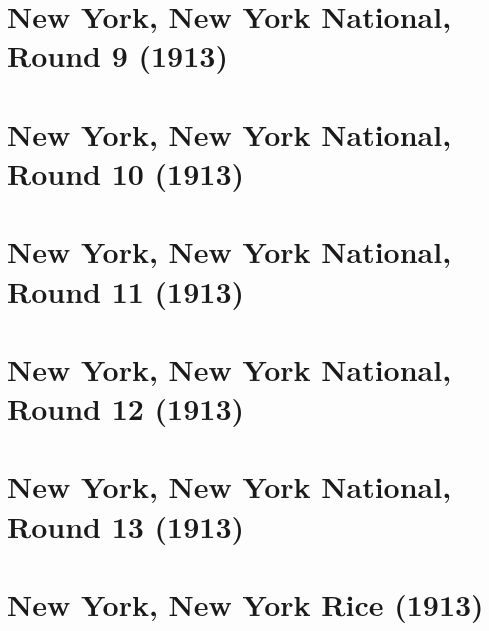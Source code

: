 \documentclass[11pt]{article}
\begin{document}
\clearpage

\section{New York, New York National, Round 9 (1913)}


\clearpage

\section{New York, New York National, Round 10 (1913)}


\clearpage

\section{New York, New York National, Round 11 (1913)}


\clearpage

\section{New York, New York National, Round 12 (1913)}


\clearpage

\section{New York, New York National, Round 13 (1913)}


\clearpage

\section{New York, New York Rice (1913)}


\clearpage



\clearpage



\clearpage



\clearpage



\clearpage



\clearpage
\end{document}
